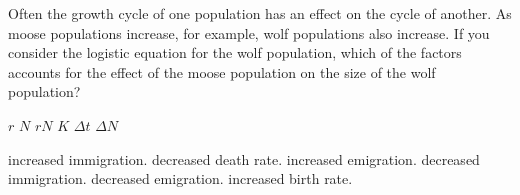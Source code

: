 \question
Often the growth cycle of one population has an effect on the cycle of another. As moose populations increase, for example, wolf populations also increase. If you consider the logistic equation for the wolf population, which of the factors accounts for the effect of the moose population on the size of the wolf population?

\begin{choices}
\choice $r$%
\choice $N$%
\choice $rN$%
\correctchoice $K$%
\choice $\Delta t$%
\choice $\Delta N$%
\end{choices}

\question

\begin{choices}
\correctchoice increased immigration.  %
\choice decreased death rate. %
\choice increased emigration.  %
\choice decreased immigration. %
\choice decreased emigration.  %
\choice increased birth rate.  %
\end{choices}

